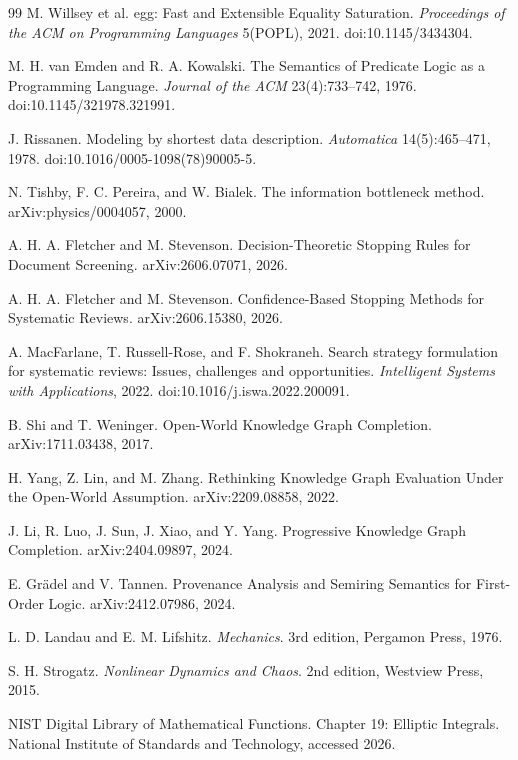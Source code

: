 \documentclass[11pt]{article}
\begin{document}
\begin{thebibliography}{99}
 M. Willsey et al. egg: Fast and Extensible Equality Saturation. \emph{Proceedings of the ACM on Programming Languages} 5(POPL), 2021. doi:10.1145/3434304.

 M. H. van Emden and R. A. Kowalski. The Semantics of Predicate Logic as a Programming Language. \emph{Journal of the ACM} 23(4):733--742, 1976. doi:10.1145/321978.321991.

 J. Rissanen. Modeling by shortest data description. \emph{Automatica} 14(5):465--471, 1978. doi:10.1016/0005-1098(78)90005-5.

 N. Tishby, F. C. Pereira, and W. Bialek. The information bottleneck method. arXiv:physics/0004057, 2000.

 A. H. A. Fletcher and M. Stevenson. Decision-Theoretic Stopping Rules for Document Screening. arXiv:2606.07071, 2026.

 A. H. A. Fletcher and M. Stevenson. Confidence-Based Stopping Methods for Systematic Reviews. arXiv:2606.15380, 2026.

 A. MacFarlane, T. Russell-Rose, and F. Shokraneh. Search strategy formulation for systematic reviews: Issues, challenges and opportunities. \emph{Intelligent Systems with Applications}, 2022. doi:10.1016/j.iswa.2022.200091.

 B. Shi and T. Weninger. Open-World Knowledge Graph Completion. arXiv:1711.03438, 2017.

 H. Yang, Z. Lin, and M. Zhang. Rethinking Knowledge Graph Evaluation Under the Open-World Assumption. arXiv:2209.08858, 2022.

 J. Li, R. Luo, J. Sun, J. Xiao, and Y. Yang. Progressive Knowledge Graph Completion. arXiv:2404.09897, 2024.

 E. Gr\"adel and V. Tannen. Provenance Analysis and Semiring Semantics for First-Order Logic. arXiv:2412.07986, 2024.

 L. D. Landau and E. M. Lifshitz. \emph{Mechanics}. 3rd edition, Pergamon Press, 1976.

 S. H. Strogatz. \emph{Nonlinear Dynamics and Chaos}. 2nd edition, Westview Press, 2015.

 NIST Digital Library of Mathematical Functions. Chapter 19: Elliptic Integrals. National Institute of Standards and Technology, accessed 2026.


\end{thebibliography}
\end{document}
